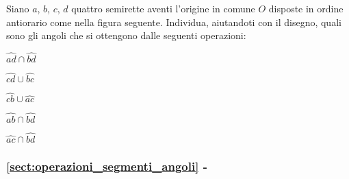 \begin{esercizio}
\label{ese:1.65}
Siano $a$, $b$, $c$, $d$ quattro semirette aventi l'origine in comune 
$O$ disposte in ordine antiorario come nella figura seguente. 
Individua, aiutandoti con il disegno, quali 
sono gli angoli che si ottengono dalle seguenti operazioni:
\noindent \begin{multicols}{5}
\noindent \begin{enumeratea}
\item $\widehat{ad} \cap \widehat{bd}$
 
\item $\widehat{cd} \cup \widehat{bc}$
 
\item $\widehat{cb} \cup \widehat{ac}$
 
\item $\widehat{ab} \cap \widehat{bd}$
 
\item $\widehat{ac} \cap \widehat{bd}$
 
\end{enumeratea}
\end{multicols}
\end{esercizio}



\begingroup
\hypersetup{linkcolor=black}
\subsubsection*{\ref{sect:operazioni_segmenti_angoli} - 
}
\endgroup

